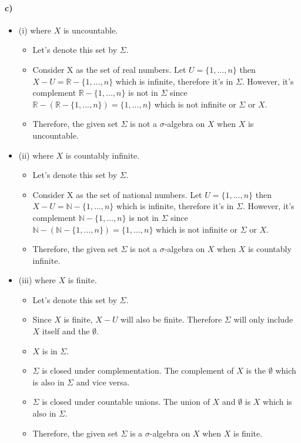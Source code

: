 \documentclass[12pt]{article}
\begin{document}
\paragraph*{c)}
\begin{itemize}
    \item (i) where $X$ is uncountable.
    \begin{itemize}
        \item Let's denote this set by $\Sigma$.
        \item Consider X as the set of real numbers. Let $U = \{1,...,n\}$ then $X - U = \mathbb{R} - \{1,...,n\}$ which is infinite, therefore it's in $\Sigma$. However, it's complement $\mathbb{R} - \{1,...,n\}$ is not in $\Sigma$ since $\mathbb{R} - (\mathbb{R} - \{1,...,n\}) = \{1,...,n\}$ which is not infinite or $\Sigma$ or $X$.
        \item Therefore, the given set $\Sigma$ is not a $\sigma$-algebra on $X$ when $X$ is uncountable.
    \end{itemize}
    \item (ii) where $X$ is countably infinite.
    \begin{itemize}
        \item Let's denote this set by $\Sigma$.
        \item Consider X as the set of national numbers. Let $U = \{1,...,n\}$ then $X - U = \mathbb{N} - \{1,...,n\}$ which is infinite, therefore it's in $\Sigma$. However, it's complement $\mathbb{N} - \{1,...,n\}$ is not in $\Sigma$ since $\mathbb{N} - (\mathbb{N} - \{1,...,n\}) = \{1,...,n\}$ which is not infinite or $\Sigma$ or $X$.
        \item Therefore, the given set $\Sigma$ is not a $\sigma$-algebra on $X$ when $X$ is countably infinite.
    \end{itemize}
    \item (iii) where $X$ is finite.
    \begin{itemize}
        \item Let's denote this set by $\Sigma$.
        \item Since $X$ is finite, $X-U$ will also be finite. Therefore $\Sigma$ will only include $X$ itself and the $\emptyset$.
        \item $X$ is in $\Sigma$.
        \item $\Sigma$ is closed under complementation. The complement of $X$ is the $\emptyset$ which is also in $\Sigma$ and vice versa.
        \item $\Sigma$ is closed under countable unions. The union of $X$ and $\emptyset$ is $X$ which is also in $\Sigma$.
        \item Therefore, the given set $\Sigma$ is a $\sigma$-algebra on $X$ when $X$ is finite.
    \end{itemize}
\end{itemize}
\end{document}
